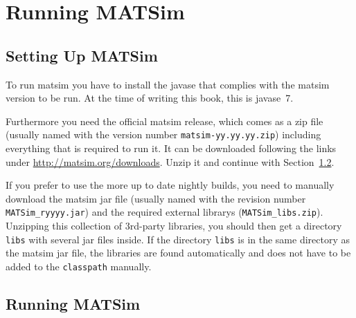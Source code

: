 \section{Running MATSim}
\label{sec:runningmatsim}

\subsection{Setting Up MATSim}
To run \gls{matsim} you have to install the \gls{javase} that complies with the \gls{matsim} version to be run. At the time of writing this book, this is \gls{javase}~7.

Furthermore you need the official \gls{matsim} release, which comes as a zip file (usually named with the version number \lstinline|matsim-yy.yy.yy.zip|) including everything that is required to run it. It can be downloaded following the links under \url{http://matsim.org/downloads}.
Unzip it and continue with Section~\ref{sec:runexample}.

If you prefer to use the more up to date nightly builds, you need to manually download the \gls{matsim} \gls{jar} file (usually named with the revision number \lstinline|MATSim_ryyyy.jar|) and the required external \glspl{library} (\lstinline|MATSim_libs.zip|). Unzipping this collection of 3rd-party libraries, you should then get a directory \lstinline|libs| with several \gls{jar} files inside. If the directory \lstinline|libs| is in the same directory as the \gls{matsim} \gls{jar} file, the libraries are found automatically and does not have to be added to the \lstinline|classpath| manually.

\subsection{Running MATSim}
\label{sec:runexample}



